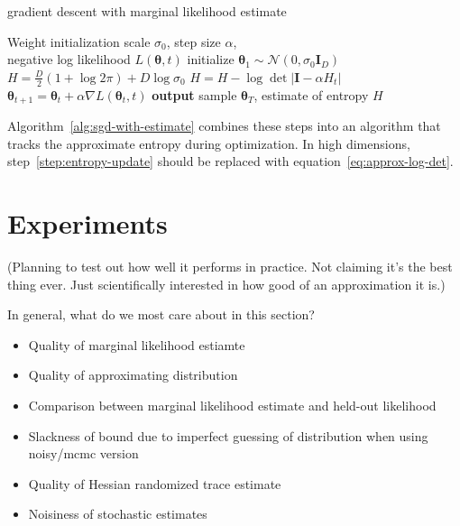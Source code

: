 \documentclass[]{article}
\newcommand{\vr}{\mathbf{r}}
\newcommand{\vg}{\mathbf{g}}
\newcommand{\vI}{\mathbf{I}}
\newcommand{\tra}{^{\mathsf{T}}}
\newcommand{\N}[2]{\mathcal{N}\!\left(#1,#2\right)}
\newcommand{\params}{\mathbf{\theta}}
\newcommand{\stepsize}{\alpha}
\newcommand{\gradparams}{\nabla L(\params_t, t)}
\newcommand{\entropy}{H}
\begin{document}
\begin{algorithm}[t]
   \caption{gradient descent with marginal likelihood estimate}
   \label{alg:sgd-with-estimate}
\begin{algorithmic}[1]
	Weight initialization scale $\sigma_0$, step size $\stepsize$, \\	
	negative log likelihood $L(\params, t)$	
	\State initialize $\params_1 \sim \N{0}{\sigma_0 \vI_D}$
	\State $\entropy = \frac{D}{2} (1 + \log 2 \pi) + D \log\sigma_0$
		\State $\entropy = \entropy - \log \det | \vI - \stepsize H_t |$   \label{step:entropy-update}
		\State $\params_{t+1} = \params_t + \stepsize \gradparams$  		
   \EndFor
   \State \textbf{output} sample $\params_T$, estimate of entropy $\entropy$
\end{algorithmic}
\end{algorithm}
%
Algorithm~\ref{alg:sgd-with-estimate} combines these steps into an algorithm that tracks the approximate entropy during optimization.
In high dimensions, step~\ref{step:entropy-update} should be replaced with equation~\eqref{eq:approx-log-det}.



\section{Experiments}

(Planning to test out how well it performs in practice. Not claiming it's the
best thing ever. Just scientifically interested in how good of an approximation
it is.)

In general, what do we most care about in this section?
\begin{itemize}
\item Quality of marginal likelihood estiamte
\item Quality of approximating distribution
\item Comparison between marginal likelihood estimate and held-out likelihood
\item Slackness of bound due to imperfect guessing of distribution when using
  noisy/mcmc version
\item Quality of Hessian randomized trace estimate
\item Noisiness of stochastic estimates
\end{itemize}
\end{document}
